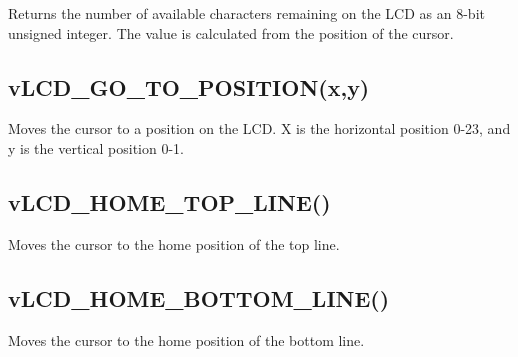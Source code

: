 Returns the number of available characters remaining on the L\-C\-D as an 8-\/bit unsigned integer. The value is calculated from the position of the cursor.\hypertarget{_usage_goto}{}\subsection{v\-L\-C\-D\-\_\-\-G\-O\-\_\-\-T\-O\-\_\-\-P\-O\-S\-I\-T\-I\-O\-N(x,y)}\label{_usage_goto}
Moves the cursor to a position on the L\-C\-D. X is the horizontal position 0-\/23, and y is the vertical position 0-\/1.\hypertarget{_test_plans_tophome}{}\subsection{v\-L\-C\-D\-\_\-\-H\-O\-M\-E\-\_\-\-T\-O\-P\-\_\-\-L\-I\-N\-E()}\label{_test_plans_tophome}
Moves the cursor to the home position of the top line.\hypertarget{_test_plans_bottomhome}{}\subsection{v\-L\-C\-D\-\_\-\-H\-O\-M\-E\-\_\-\-B\-O\-T\-T\-O\-M\-\_\-\-L\-I\-N\-E()}\label{_test_plans_bottomhome}
Moves the cursor to the home position of the bottom line. 